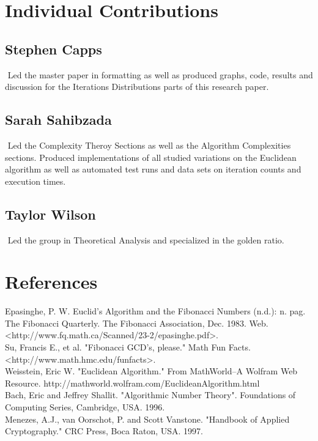 \documentclass[11pt]{article}
\begin{document}
\section{Individual Contributions}
\subsection{Stephen Capps}$ $
\indent Led the master paper in formatting as well as produced graphs, code, results and discussion for the Iterations Distributions parts of this research paper.
\subsection{Sarah Sahibzada}$ $
\indent Led the Complexity Theroy Sections as well as the Algorithm Complexities sections. Produced implementations of all studied variations on the Euclidean algorithm as well as automated test runs and data sets on iteration counts and execution times. 
\subsection{Taylor Wilson}$ $
\indent Led the group in Theoretical Analysis and  specialized in the golden ratio.


\newpage
\section{References}
\noindent Epasinghe, P. W. Euclid's Algorithm and the Fibonacci Numbers (n.d.): n. pag. The Fibonacci Quarterly. The Fibonacci Association, Dec. 1983. Web. <http://www.fq.math.ca/Scanned/23-2/epasinghe.pdf>.
\\ 

\noindent Su, Francis E., et al. "Fibonacci GCD's, please." Math Fun Facts. \\<http://www.math.hmc.edu/funfacts>. \\

\noindent Weisstein, Eric W. "Euclidean Algorithm." From MathWorld--A Wolfram Web Resource. http://mathworld.wolfram.com/EuclideanAlgorithm.html \\

\noindent Bach, Eric and Jeffrey Shallit. "Algorithmic Number Theory". Foundations of Computing Series, Cambridge, USA. 1996. \\

\noindent Menezes, A.J., van Oorschot, P. and Scott Vanstone. "Handbook of Applied Cryptography." CRC Press, Boca Raton, USA. 1997.
\end{document}
